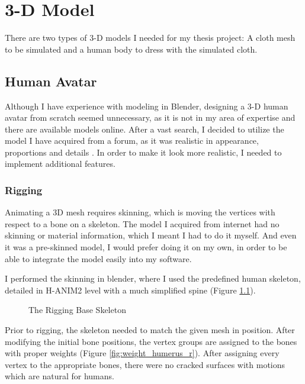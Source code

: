 \chapter{3-D Model}
\label{chapter1}

There are two types of 3-D models I needed for my thesis project: A cloth mesh to be simulated and a human body to dress with the simulated cloth.

\section{Human Avatar}
\label{section4_1}

Although I have experience with modeling in Blender, designing a 3-D human avatar from scratch seemed unnecessary, as it is not in my area of expertise and there are available models online. After a vast search, I decided to utilize the model I have acquired from a forum, as it was realistic in appearance, proportions and details \cite{Mmava2012}. In order to make it look more realistic, I needed to implement additional features.

\subsection{Rigging}

Animating a 3D mesh requires skinning, which is moving the vertices with respect to a bone on a skeleton. The model I acquired from internet had no skinning or material information, which I meant I had to do it myself. And even it was a pre-skinned model, I would prefer doing it on my own, in order to be able to integrate the model easily into my software. 

I performed the skinning in blender, where I used the predefined human skeleton, detailed in H-ANIM2 level with a much simplified spine (Figure \ref{fig:rigging_skeleton}). 

\begin{figure}[h]
\centerline{}
\caption{The Rigging Base Skeleton}
\label{fig:rigging_skeleton}
\end{figure}

Prior to rigging, the skeleton needed to match the given mesh in position. After modifying the initial bone positions, the vertex groups are assigned to the bones with proper weights (Figure \ref{fig:weight_humerus_r}). After assigning every vertex to the appropriate bones, there were no cracked surfaces with motions which are natural for humans. 

